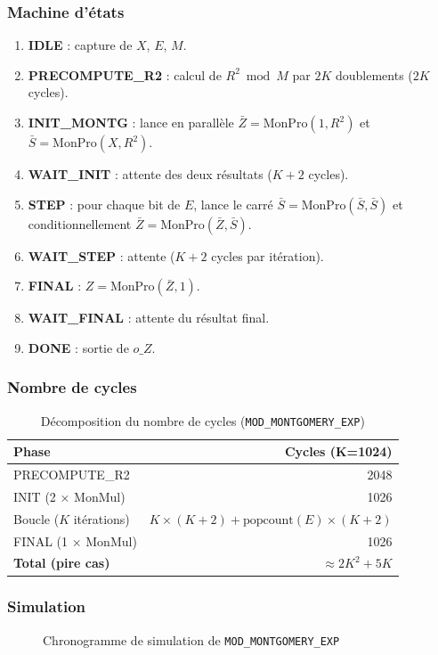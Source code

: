 \documentclass[12pt,a4paper]{report}
\begin{document}
\subsubsection{Machine d'états}
\begin{enumerate}
  \item \textbf{IDLE} : capture de $X$, $E$, $M$.
  \item \textbf{PRECOMPUTE\_R2} : calcul de $R^2 \bmod M$ par $2K$
        doublements ($2K$ cycles).
  \item \textbf{INIT\_MONTG} : lance en parallèle
        $\bar{Z} = \text{MonPro}(1, R^2)$ et
        $\bar{S} = \text{MonPro}(X, R^2)$.
  \item \textbf{WAIT\_INIT} : attente des deux résultats ($K+2$ cycles).
  \item \textbf{STEP} : pour chaque bit de $E$, lance le carré
        $\bar{S} = \text{MonPro}(\bar{S}, \bar{S})$ et conditionnellement
        $\bar{Z} = \text{MonPro}(\bar{Z}, \bar{S})$.
  \item \textbf{WAIT\_STEP} : attente ($K+2$ cycles par itération).
  \item \textbf{FINAL} : $Z = \text{MonPro}(\bar{Z}, 1)$.
  \item \textbf{WAIT\_FINAL} : attente du résultat final.
  \item \textbf{DONE} : sortie de $o\_Z$.
\end{enumerate}

\subsubsection{Nombre de cycles}
\begin{table}[H]
\centering
\caption{Décomposition du nombre de cycles (\texttt{MOD\_MONTGOMERY\_EXP})}
\begin{tabular}{lr}
\toprule
\textbf{Phase} & \textbf{Cycles (K=1024)} \\
\midrule
PRECOMPUTE\_R2          & 2048 \\
INIT (2 × MonMul)      & 1026 \\
Boucle ($K$ itérations) & $K \times (K+2) + \text{popcount}(E) \times (K+2)$ \\
FINAL (1 × MonMul)     & 1026 \\
\midrule
\textbf{Total (pire cas)} & $\approx 2K^2 + 5K$ \\
\bottomrule
\end{tabular}
\end{table}

\subsubsection{Simulation}
\begin{figure}[H]
\centering
{}
\caption{Chronogramme de simulation de \texttt{MOD\_MONTGOMERY\_EXP}}
\label{fig:sim_exp}
\end{figure}
\end{document}
